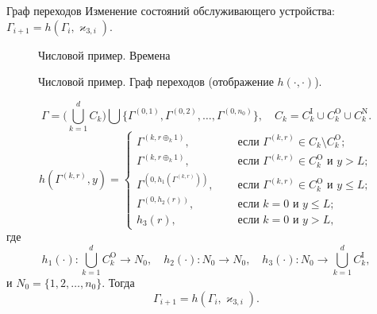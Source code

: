 \documentclass[10pt]{beamer}
\begin{document}
\begin{frame}[allowframebreaks]{Граф переходов}
 Изменение состояний обслуживающего устройства: $\Gamma_{i+1}=h(\Gamma_i,\varkappa_{3,i})$.
   \begin{figure}[h]
    \centering
    \caption{Числовой пример. Времена}
    \label{VK:fig:3}
  \end{figure}
   \begin{figure}[h]
    \centering
    \caption{Числовой пример. Граф переходов (отображение $h(\cdot,\cdot)$).}
    \label{VK:fig:3}
  \end{figure}

  \begin{equation}
  \Gamma = \bigl( \bigcup_{k=1}^d C_k \bigr) \bigcup \{\Gamma^{(0,1)}, \Gamma^{(0,2)}, \ldots, \Gamma^{(0,n_0)}\}, \quad C_k = C_k^{\mathrm{I}} \cup C_k^{\mathrm{O}}  \cup C_k^{\mathrm{N}}.
  \end{equation}
  \begin{equation}
h(\Gamma^{(k,r)},y) = 
\begin{cases}
\Gamma^{(k,r\oplus_k 1)},& \quad \text{ если } \Gamma^{(k,r)}\in C_k\setminus C_k^{\mathrm{O}};\\
\Gamma^{(k,r\oplus_k 1)},& \quad \text{ если } \Gamma^{(k,r)}\in C_k^{\mathrm{O}} \text{ и } y>L;\\
\Gamma^{(0,h_1(\Gamma^{(k,r)}))},& \quad \text{ если } \Gamma^{(k,r)}\in C_k^{\mathrm{O}} \text{ и } y\leqslant L;\\
\Gamma^{(0,h_2(r))},& \quad \text{ если } k=0 \text{ и } y\leqslant L;\\
h_3(r),& \quad \text{ если } k=0 \text{ и } y > L,
\end{cases}
\end{equation}
где 
$$h_1(\cdot)\colon \bigcup_{k=1}^d C_k^{\mathrm{O}}\to N_0, \quad h_2(\cdot)\colon N_0\to N_0, \quad h_3(\cdot)\colon N_0 \to\bigcup_{k=1}^d C_k^{\mathrm{I}},$$ и $N_0=\{1,2, \ldots, n_0\}$.
Тогда 
\begin{equation}
\Gamma_{i+1} = h(\Gamma_i, \varkappa_{3,i}).
\end{equation}
\end{frame}
\end{document}
